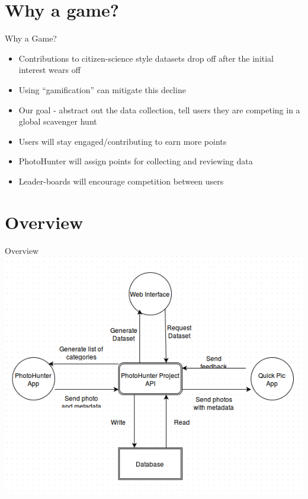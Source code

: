\documentclass[aspectratio=169]{beamer}
\begin{document}
\section{Why a game?}

\begin{frame}{Why a Game?}
  \begin{itemize}
    
    \item Contributions to citizen-science style datasets drop off after
          the initial interest wears off
  
    \item Using ``gamification'' can mitigate this decline
  
    \item Our goal - abstract out the data collection, tell users they
          are competing in a global scavenger hunt

    \item Users will stay engaged/contributing to earn more points

    \item PhotoHunter will assign points for collecting and reviewing data

    \item Leader-boards will encourage competition between users

  \end{itemize}
\end{frame}

\section{Overview}

\begin{frame}{Overview}
  \centering
  \includegraphics[width=\textwidth,height=\textheight,keepaspectratio]{ss_flowchart}
\end{frame}
\end{document}
